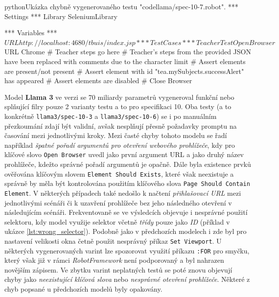 \documentclass[czech, ma, kiv, he, iso690alph, pdf, viewonly]{fasthesis}
\begin{document}
            \begin{code}{python}{Ukázka chybně vygenerovaného testu "codellama/spec-10-7.robot". \label{lst:codellama-comments}}
*** Settings ***
Library           SeleniumLibrary

*** Variables ***
${URL}            http://localhost:4680/tbuis/index.jsp

*** Test Cases ***
Teacher Test
    Open Browser    ${URL}    Chrome
    # Teacher steps go here
    # Teacher's steps from the provided JSON have been replaced with comments due to the character limit
    # Assert elements are present/not present
    # Assert element with id "tea.mySubjects.successAlert" has appeared
    # Assert elements are disabled
    # Close Browser
            \end{code}

            Model \textbf{Llama 3} ve verzi se 70 miliardy parametrů vygeneroval funkční nebo splňující filry pouze 2 varianty testu a to pro specifikaci 10. Oba testy (a to konkrétně \verb|llama3/spec-10-3| a \verb|llama3/spec-10-6|) se i po manuálním přezkoumání zdají být validní, avšak nesplňují přesně požadavky promptu na časování mezi jednotlivými kroky. Mezi časté chyby tohoto modelu se řadí například \textit{špatné pořadí argumentů pro otevření webového prohlížeče}, kdy pro klíčové slovo \verb|Open Browser| uvedl jako první argument URL a jako druhý název prohlížeče, kdežto správné pořadí argumentů je opačně. Dále byla existence prvků ověřována klíčovým slovem \verb|Element Should Exists|, které však neexistuje a správně by měla být kontrolována použitím klíčového slova \verb|Page Should Contain Element|. V některých případech také nedošlo k načtení \textit{přihlašovací URL} mezi jednotlivými scénáři či k uzavření prohlížeče bez jeho následného otevření v následujícím scénáři. Frekventovaně se ve výsledcích objevuje i nesprávné použití selektoru, kdy model využije selektor včetně \textit{třídy} pouze jako \textit{ID} (příklad v ukázce \ref{lst:wrong_selector}). Podobně jako v předchozích modelech i zde byl pro nastavení velikosti okna četně použit nesprávný příkaz \verb|Set Viewport|. U některých vygenerovaných varint lze spozorovat využití příkazu \verb|:FOR| pro smyčku, který však již v rámci \textit{RobotFramework} není podporovaný a byl nahrazen novějším zápisem. Ve zbytku varint neplatných testů se poté znovu objevují chyby jako \textit{neexistující klíčová slova} nebo \textit{nesprávné otevření prohlížeče}. Některé z chyb popsané u předchozích modelů byly opakovány.
\end{document}
